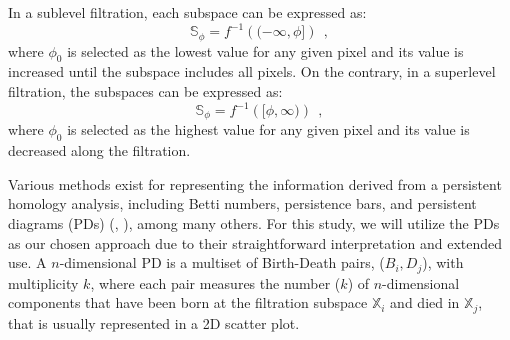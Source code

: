 \documentclass[12pt]{mythesis}
\begin{document}
In a sublevel filtration, each subspace can be expressed as:
\begin{equation}
    \mathbb{S} _ \phi = f ^{-1} \left( ( -\infty, \phi ] \right) \ \ ,
    \label{eq: sublevel}
\end{equation}
where $\phi_0$ is selected as the lowest value for any given pixel and its value is increased until the subspace includes all pixels. On the contrary, in a superlevel filtration, the subspaces can be expressed as:
\begin{equation}
    \mathbb{S} _ \phi = f ^{-1} \left( [ \phi, \infty ) \right)\ \ , 
    \label{eq : superlevel}
\end{equation}
where $\phi_0$ is selected as the highest value for any given pixel and its value is decreased along the filtration.

Various methods exist for representing the information derived from a persistent homology analysis, including Betti numbers, persistence bars, and persistent diagrams (PDs) (\citealt{pd_stability}, \citealt{pbars}), among many others. For this study, we will utilize the PDs as our chosen approach due to their straightforward interpretation and extended use. A $n$-dimensional PD is a multiset of Birth-Death pairs, ($B _ i, D _ j$), with multiplicity $k$, where each pair measures the number ($k$) of $n$-dimensional components that have been born at the filtration subspace $\mathbb{X}_i$ and died in $\mathbb{X}_j$, that is usually represented in a 2D scatter plot. 
\end{document}

